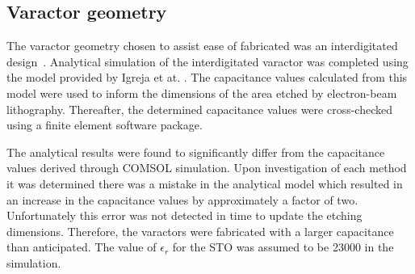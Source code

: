 \documentclass[10pt,a4paper,twoside]{article}
\begin{document}
\begin{multicols}{2}
\subsection{\label{subsec:Varactorgeometry}Varactor geometry}
The varactor geometry chosen to assist ease of fabricated was an interdigitated design~\cite{PhysRevB.19.3593}. Analytical simulation of the interdigitated varactor was completed using the model provided by Igreja et at. \cite{Igreja2004AnalyticalStructure}. The capacitance values calculated from this model were used to inform the dimensions of the area etched by electron-beam lithography. Thereafter, the determined capacitance values were cross-checked using a finite element software package. 
\par
The analytical results were found to significantly differ from the capacitance values derived through COMSOL simulation. Upon investigation of each method it was determined there was a mistake in the analytical model which resulted in an increase in the capacitance values by approximately a factor of two. Unfortunately this error was not detected in time to update the etching dimensions. Therefore, the varactors were fabricated with a larger capacitance than anticipated. The value of $\epsilon_{r}$ for the STO was assumed to be 23000 in the simulation.   
\par

\end{multicols}
\end{document}
